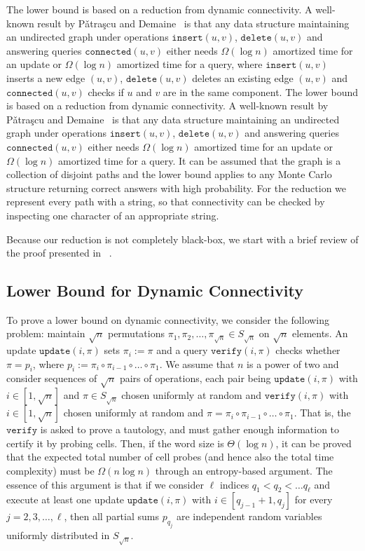 \documentclass[a4paper]{article}
\newenvironment{shortv}{}{}
\theoremstyle{remark}
\newcommand{\insertop}{\mathtt{insert}}
\newcommand{\deleteop}{\mathtt{delete}}
\newcommand{\connectedop}{\mathtt{connected}}
\newcommand{\updateop}{\mathtt{update}}
\newcommand{\verifyop}{\mathtt{verify}}
\begin{document}
The lower bound is based on a reduction from dynamic connectivity. A well-known
result by P\v{a}tra\c{s}cu and Demaine~\cite{logarithmic} is that any data structure maintaining
an undirected graph under operations $\insertop(u,v)$, $\deleteop(u,v)$ and answering queries
$\connectedop(u,v)$ either needs $\Omega(\log n)$ amortized time for an update or
$\Omega(\log n)$ amortized time for a query, where $\insertop(u,v)$ inserts a new edge $(u,v)$,
$\deleteop(u,v)$ deletes an existing edge $(u,v)$ and $\connectedop(u,v)$ checks if
$u$ and $v$ are in the same component.
\begin{shortv}
The lower bound is based on a reduction from dynamic connectivity. A well-known
result by P\v{a}tra\c{s}cu and Demaine~\cite{logarithmic} is that any data structure maintaining
an undirected graph under operations $\insertop(u,v)$, $\deleteop(u,v)$ and answering queries
$\connectedop(u,v)$ either needs $\Omega(\log n)$ amortized time for an update or
$\Omega(\log n)$ amortized time for a query.\end{shortv}
It can be assumed that the graph is
a collection of disjoint paths and the lower bound applies to any Monte Carlo structure returning
correct answers with high probability. For the reduction we represent every path with
a string, so that connectivity can be checked by inspecting one character of an appropriate string.

Because our reduction is not completely black-box,
we start with a brief review of the proof presented in ~\cite{logarithmic}.

\subsection{Lower Bound for Dynamic Connectivity}
To prove a lower bound on dynamic connectivity, we consider the following problem:
maintain $\sqrt{n}$ permutations $\pi_1,\pi_2,\ldots,\pi_{\sqrt{n}}\in S_{\sqrt{n}}$ on
$\sqrt{n}$ elements. An update $\updateop(i,\pi)$ sets $\pi_i := \pi$ and a query
$\verifyop(i,\pi)$ checks whether $\pi = p_i$,
where $p_i := \pi_{i} \circ \pi_{i-1} \circ \ldots \circ \pi_{1}$.
We assume that $n$ is a power of two and consider sequences
of $\sqrt{n}$ pairs of operations, each pair being $\updateop(i,\pi)$
with $i\in [1,\sqrt{n}]$ and $\pi\in S_{\sqrt{n}}$ chosen uniformly at random and $\verifyop(i,\pi)$ with
$i\in [1,\sqrt{n}]$ chosen uniformly at random and $\pi = \pi_{i} \circ \pi_{i-1} \circ \ldots \circ \pi_{1}$.
That is, the $\verifyop$ is asked to prove a tautology, and must gather enough information
to certify it by probing cells. Then, if the word size is $\Theta(\log n)$,
it can be proved that the expected total number of cell probes (and hence also the total time
complexity) must be $\Omega(n\log n)$ through an entropy-based argument. The essence
of this argument is that if we consider $\ell$ indices $q_1 < q_2 < \ldots q_\ell$
and execute at least one update $\updateop(i,\pi)$ with $i\in [q_{j-1}+1,q_j]$ for
every $j=2,3,\ldots,\ell$, then all partial sums $p_{q_j}$ are independent random
variables uniformly distributed in $S_{\sqrt{n}}$.
\end{document}
